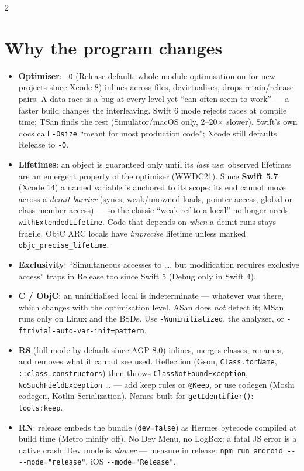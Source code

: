 \documentclass[8pt]{extarticle}
\newcommand\ct[1]{\texttt{#1}}
\newcommand\dd{\hbox{-}\hbox{-}}
\begin{document}
\begin{multicols}{2}
\small{}\raggedright

\section{Why the program changes}
\begin{itemize}
  \item \textbf{Optimiser}: \ct{-O} (Release default; whole-module optimisation on for new
        projects since Xcode 8) inlines across files, devirtualises, drops retain/release pairs.
        A data race is a bug at every level yet ``can often seem to work'' — a faster build
        changes the interleaving. Swift 6 mode rejects races at compile time; TSan finds the
        rest (Simulator/macOS only, 2–20$\times$ slower). Swift's own docs call \ct{-Osize}
        ``meant for most production code''; Xcode still defaults Release to \ct{-O}.
  \item \textbf{Lifetimes}: an object is guaranteed only until its \emph{last use}; observed
        lifetimes are an emergent property of the optimiser (WWDC21). Since \textbf{Swift 5.7}
        (Xcode 14) a named variable is anchored to its scope: its end cannot move across a
        \emph{deinit barrier} (syncs, weak/unowned loads, pointer access, global or class-member
        access) — so the classic ``weak ref to a local'' no longer needs
        \ct{withExtendedLifetime}. Code that depends on \emph{when} a deinit runs stays fragile.
        ObjC ARC locals have \emph{imprecise} lifetime unless marked \ct{objc\_precise\_lifetime}.
  \item \textbf{Exclusivity}: ``Simultaneous accesses to …, but modification requires exclusive
        access'' traps in Release too since Swift 5 (Debug only in Swift 4).
  \item \textbf{C / ObjC}: an uninitialised local is indeterminate — whatever was there, which
        changes with the optimisation level. ASan does \emph{not} detect it; MSan runs only on
        Linux and the BSDs. Use \ct{-Wuninitialized}, the analyzer, or
        \ct{-ftrivial-auto-var-init=pattern}.
  \item \textbf{R8} (full mode by default since AGP 8.0) inlines, merges classes, renames, and
        removes what it cannot see used. Reflection (Gson, \ct{Class.forName},
        \ct{::class.constructors}) then throws \ct{ClassNotFoundException},
        \ct{NoSuchFieldException} … — add keep rules or \ct{@Keep}, or use codegen (Moshi codegen,
        Kotlin Serialization). Names built for \ct{getIdentifier()}: \ct{tools:keep}.
  \item \textbf{RN}: release embeds the bundle (\ct{dev=false}) as Hermes bytecode compiled at
        build time (Metro minify off). No Dev Menu, no LogBox: a fatal JS error is a native
        crash. Dev mode is \emph{slower} — measure in release:
        \ct{npm run android \dd{} \dd{}mode="release"}, iOS \ct{\dd{}mode="Release"}.
\end{itemize}


\end{multicols}
\end{document}
